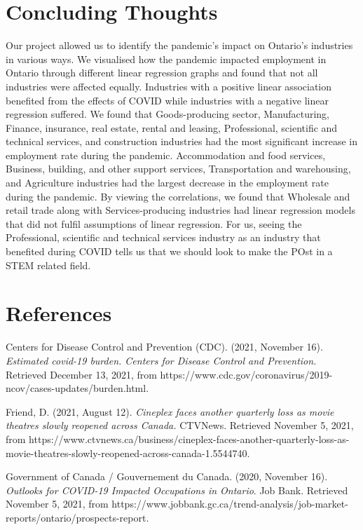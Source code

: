 \documentclass[fontsize=11pt]{article}
\begin{document}
\section{Concluding Thoughts}
Our project allowed us to identify the pandemic’s impact on Ontario's industries in various ways. We visualised how the pandemic impacted employment in Ontario through different linear regression graphs and found that not all industries were affected equally. Industries with a positive linear association benefited from the effects of COVID while industries with a negative linear regression suffered. We found that Goods-producing sector, Manufacturing, Finance, insurance, real estate, rental and leasing, Professional, scientific and technical services, and construction industries had the most significant increase in employment rate during the pandemic. Accommodation and food services, Business, building, and other support services, Transportation and warehousing, and Agriculture industries had the largest decrease in the employment rate during the pandemic. By viewing the correlations, we found that Wholesale and retail trade along with Services-producing industries had linear regression models that did not fulfil assumptions of linear regression. For us, seeing the Professional, scientific and technical services industry as an industry that benefited during COVID tells us that we should look to make the POst in a STEM related field.
\newpage

\centering
\section*{References}
\raggedright

Centers for Disease Control and Prevention (CDC). (2021, November 16). \textit{Estimated covid-19 burden. Centers for Disease Control and Prevention.} \hangindent=0.7cm Retrieved December 13, 2021, from https://www.cdc.gov/coronavirus/2019-ncov/cases-updates/burden.html.
\medskip

Friend, D. (2021, August 12). \textit{Cineplex faces another quarterly loss as movie theatres slowly reopened across Canada.} \hangindent=0.7cm CTVNews. Retrieved November 5, 2021, from https://www.ctvnews.ca/business/cineplex-faces-another-quarterly-loss-as-movie-theatres-slowly-reopened-across-canada-1.5544740.
\medskip

\hangindent=0.7cm Government of Canada / Gouvernement du Canada. (2020, November 16). \textit{Outlooks for COVID-19 Impacted Occupations in Ontario}. Job Bank. Retrieved November 5, 2021, from https://www.jobbank.gc.ca/trend-analysis/job-market-reports/ontario/prospects-report.
\medskip
\end{document}
